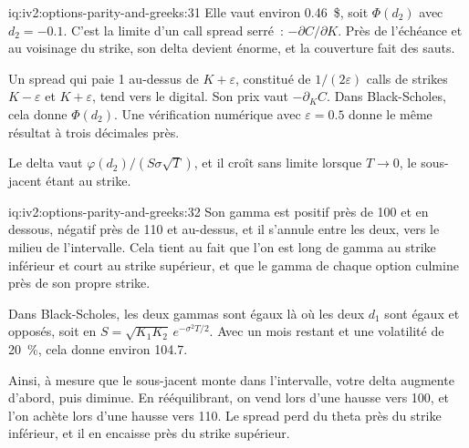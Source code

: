 \begin{solution}{iq:iv2:options-parity-and-greeks:31}
Elle vaut environ 0.46~\$, soit $\Phi(d_2)$ avec $d_2 = -0.1$. C'est la limite d'un call spread serré~: $-\partial C/\partial K$. Près de l'échéance et au voisinage du strike, son delta devient énorme, et la couverture fait des sauts.

Un spread qui paie 1 au-dessus de $K + \varepsilon$, constitué de $1/(2\varepsilon)$ calls de strikes $K - \varepsilon$ et $K + \varepsilon$, tend vers le digital. Son prix vaut $-\partial_K C$. Dans Black-Scholes, cela donne $\Phi(d_2)$. Une vérification numérique avec $\varepsilon = 0.5$ donne le même résultat à trois décimales près.

Le delta vaut $\varphi(d_2)/(S\sigma\sqrt T)$, et il croît sans limite lorsque $T \to 0$, le sous-jacent étant au strike.

\end{solution}

\begin{solution}{iq:iv2:options-parity-and-greeks:32}
Son gamma est positif près de 100 et en dessous, négatif près de 110 et au-dessus, et il s'annule entre les deux, vers le milieu de l'intervalle. Cela tient au fait que l'on est long de gamma au strike inférieur et court au strike supérieur, et que le gamma de chaque option culmine près de son propre strike.

Dans Black-Scholes, les deux gammas sont égaux là où les deux $d_1$ sont égaux et opposés, soit en $S = \sqrt{K_1K_2}\,e^{-\sigma^2T/2}$. Avec un mois restant et une volatilité de 20~\%, cela donne environ 104.7.

Ainsi, à mesure que le sous-jacent monte dans l'intervalle, votre delta augmente d'abord, puis diminue. En rééquilibrant, on vend lors d'une hausse vers 100, et l'on achète lors d'une hausse vers 110. Le spread perd du theta près du strike inférieur, et il en encaisse près du strike supérieur.

\end{solution}

